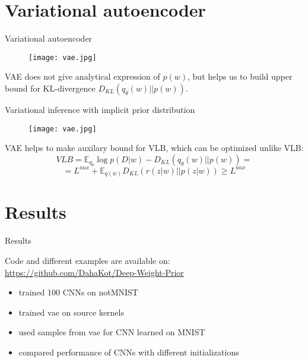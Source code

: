 \documentclass[19pt]{beamer}
\begin{document}
\section{Variational autoencoder}

\begin{frame}{Variational autoencoder}

\begin{figure}
    \centering
    \texttt{[image: vae.jpg]}
    \label{fig:my_label}
\end{figure}

VAE does not give analytical expression of $p(w)$, but helps us to build upper bound for KL-divergence $D_{KL}(q_{\theta}(w) \vert \vert p(w))$.
\end{frame}

\begin{frame}{Variational inference with implicit prior distribution}

\begin{figure}
    \centering
    \texttt{[image: vae.jpg]}
    \label{fig:my_label}
\end{figure}

VAE helps to make auxilary bound for VLB, which can be optimized unlike VLB:\\

$$
VLB = \mathbb{E}_{q_{\theta}} \log p(D \vert w) - D_{KL}(q_{\theta}(w) \vert \vert p(w)) = 
$$
$$
= L^{aux} +  \mathbb{E}_{q(w)}D_{KL}(r(z \vert w) \vert \vert p(z \vert w)) \geq L^{aux}
$$

\end{frame}

\section{Results}

\begin{frame}{Results}

Code and different examples are available on: \url{https://github.com/DahaKot/Deep-Weight-Prior} \\

\begin{itemize}
    \item trained 100 CNNs on notMNIST
    \item trained vae on source kernels
    \item used samples from vae for CNN learned on MNIST
    \item compared performance of CNNs with different initializations
\end{itemize}

\end{frame}
\end{document}
